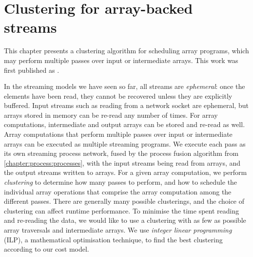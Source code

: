 \chapter{Clustering for array-backed streams}
\label{clustering}



This chapter presents a clustering algorithm for scheduling array programs, which may perform multiple passes over input or intermediate arrays.
This work was first published as \citet{robinson2014fusing}.

In the streaming models we have seen so far, all streams are \emph{ephemeral}: once the elements have been read, they cannot be recovered unless they are explicitly buffered.
Input streams such as reading from a network socket are ephemeral, but arrays stored in memory can be re-read any number of times.
For array computations, intermediate and output arrays can be stored and re-read as well.
Array computations that perform multiple passes over input or intermediate arrays can be executed as multiple streaming programs.
We execute each pass as its own streaming process network, fused by the process fusion algorithm from \cref{chapter:process:processes}, with the input streams being read from arrays, and the output streams written to arrays.
For a given array computation, we perform \emph{clustering} to determine how many passes to perform, and how to schedule the individual array operations that comprise the array computation among the different passes.
There are generally many possible clusterings, and the choice of clustering can affect runtime performance.
To minimise the time spent reading and re-reading the data, we would like to use a clustering with as few as possible array traversals and intermediate arrays.
We use \emph{integer linear programming} (ILP), a mathematical optimisation technique, to find the best clustering according to our cost model.

